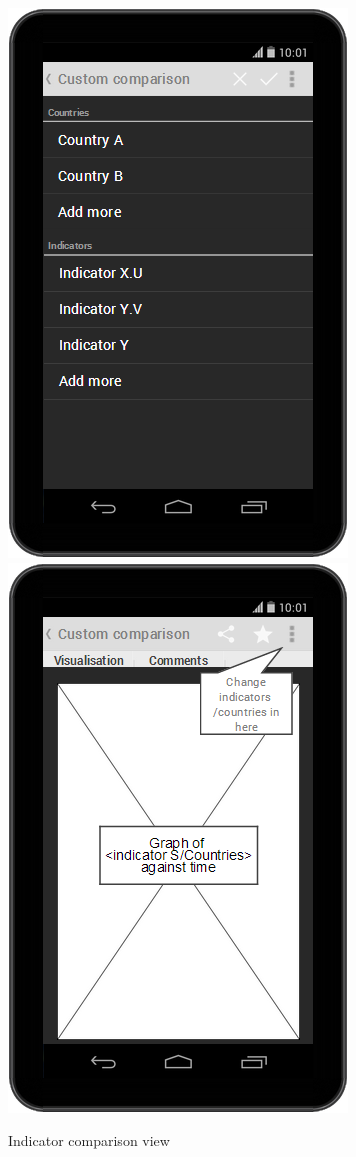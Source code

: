 \documentclass[12pt,a4paper,twoside]{article}
\begin{document}
\begin{figure}[H]
\centering
\includegraphics[scale=0.4]{mocks/compare1.png}
\includegraphics[scale=0.4]{mocks/compare2.png}
\caption{Indicator comparison view}
\end{figure}
\end{document}
